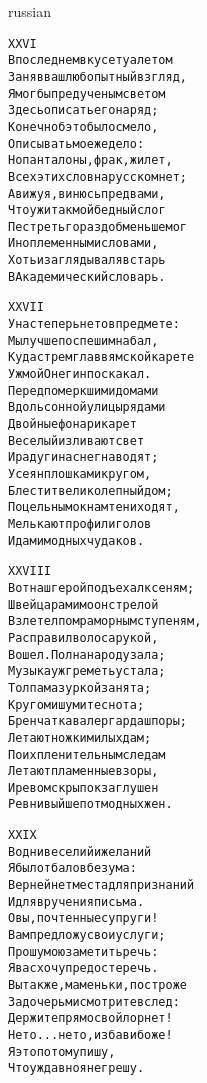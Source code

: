 \documentclass[12pt,twocolumn]{article}
\begin{document}
\begin{center}
\begin{otherlanguage*}{russian}
\begin{minipage}[t]{\dimexpr 0.5\textwidth -\tabcolsep-.5pt}
\begin{alltt}\normalfont\centering
XXVI
В последнем вкусе туалетом
Заняв ваш любопытный взгляд,
Я мог бы пред ученым светом
Здесь описать его наряд;
Конечно б это было смело,
Описывать мое же дело:
Но панталоны, фрак, жилет,
Всех этих слов на русском нет;
А вижу я, винюсь пред вами,
Что уж и так мой бедный слог
Пестреть гораздо б меньше мог
Иноплеменными словами,
Хоть и заглядывал я встарь
В Академический словарь.
\end{alltt}
\end{minipage}
\clearpage

\begin{minipage}[t]{\dimexpr 0.5\textwidth -\tabcolsep-.5pt}
\begin{alltt}\normalfont\centering
XXVII
У нас теперь не то в предмете:
Мы лучше поспешим на бал,
Куда стремглав в ямской карете
Уж мой Онегин поскакал.
Перед померкшими домами
Вдоль сонной улицы рядами
Двойные фонари карет
Веселый изливают свет
И радуги на снег наводят;
Усеян плошками кругом,
Блестит великолепный дом;
По цельным окнам тени ходят,
Мелькают профили голов
И дам и модных чудаков.
\end{alltt}
\end{minipage}

\begin{minipage}[t]{\dimexpr 0.5\textwidth -\tabcolsep-.5pt}
\begin{alltt}\normalfont\centering
XXVIII
Вот наш герой подъехал к сеням;
Швейцара мимо он стрелой
Взлетел по мраморным ступеням,
Расправил волоса рукой,
Вошел. Полна народу зала;
Музыка уж греметь устала;
Толпа мазуркой занята;
Кругом и шум и теснота;
Бренчат кавалергарда шпоры;
Летают ножки милых дам;
По их пленительным следам
Летают пламенные взоры,
И ревом скрыпок заглушен
Ревнивый шепот модных жен.
\end{alltt}
\end{minipage}
\clearpage

\begin{minipage}[t]{\dimexpr 0.5\textwidth -\tabcolsep-.5pt}
\begin{alltt}\normalfont\centering
XXIX
Во дни веселий и желаний
Я был от балов без ума:
Верней нет места для признаний
И для вручения письма.
О вы, почтенные супруги!
Вам предложу свои услуги;
Прошу мою заметить речь:
Я вас хочу предостеречь.
Вы также, маменьки, построже
За дочерьми смотрите вслед:
Держите прямо свой лорнет!
Не то... не то, избави боже!
Я это потому пишу,
Что уж давно я не грешу.
\end{alltt}
\end{minipage}


\end{otherlanguage*}
\end{center}
\end{document}
